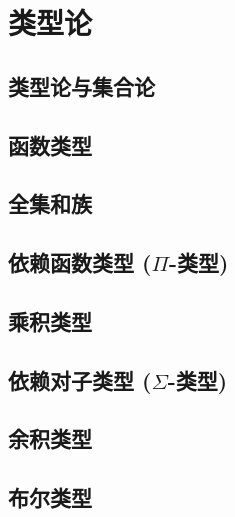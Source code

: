 \chapter{类型论}
\label{cha:typetheory}

\section{类型论与集合论}
\label{sec:types-vs-sets}


\section{函数类型}
\label{sec:function-types}


\section{全集和族}
\label{sec:universes}


\section{依赖函数类型 (\texorpdfstring{$\Pi$}{Π}-类型)}
\label{sec:pi-types}


\section{乘积类型}
\label{sec:finite-product-types}


\section{依赖对子类型 (\texorpdfstring{$\Sigma$}{Σ}-类型)}
\label{sec:sigma-types}


\section{余积类型}
\label{sec:coproduct-types}


\section{布尔类型}
\label{sec:type-booleans}


